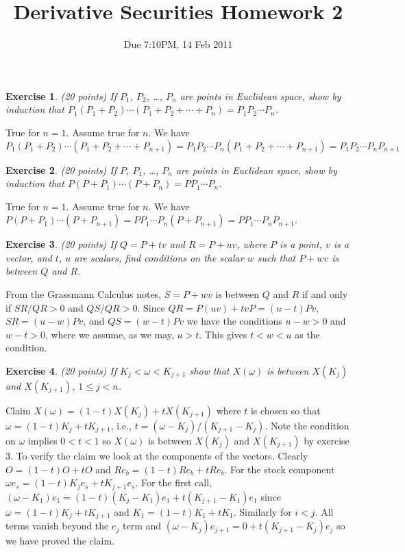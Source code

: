 \documentclass[11pt,fleqn]{amsproc}
\newtheorem{xca}{Exercise}
\begin{document}
\title{Derivative Securities Homework 2}
\author{Due 7:10PM, 14 Feb 2011}

\maketitle

\begin{xca}{(20 points)}
If $P_1$, $P_2$, \dots, $P_n$ are points in Euclidean space, show by
induction that $P_1(P_1 + P_2)\cdots(P_1 + P_2 + \cdots + P_n) = P_1
P_2 \cdots P_n$.

\end{xca}
True for $n = 1$. Assume true for $n$. We have
$P_1(P_1 + P_2)\cdots(P_1 + P_2 + \cdots + P_{n+1})
= P_1P_2 \cdots P_n(P_1 + P_2 + \cdots + P_{n+1})
= P_1P_2 \cdots P_n P_{n+1}$

\begin{xca}{(20 points)}
If $P$, $P_1$, \dots, $P_n$ are points in Euclidean space, show by
induction that $P(P + P_1)\cdots(P + P_n) = PP_1\cdots P_n$.

\end{xca}

True for $n = 1$. Assume true for $n$. We have
$P(P + P_1)\cdots(P + P_{n+1}) = PP_1\cdots P_n(P + P_{n+1})
= PP_1\cdots P_n P_{n+1}$.

\begin{xca}{(20 points)}
If $Q = P + tv$ and $R = P + uv$, where $P$ is a point, $v$ is a vector,
and $t$, $u$ are scalars, find conditions on the scalar $w$ such that $P +
wv$ is between $Q$ and $R$.

\end{xca}

From the Grassmann Calculus notes, $S = P + wv$ is between $Q$ and
$R$ if and only if $SR/QR > 0$ and $QS/QR > 0$. Since
$QR = P(uv) + tvP = (u - t)Pv$, $SR = (u - w)Pv$, and
$QS = (w - t)Pv$ we have the conditions $u - w > 0$ and
$w - t > 0$, where we assume, as we may, $u > t$.
This gives $t < w < u$ as the condition.

\begin{xca}{(20 points)}
If $K_j < \omega < K_{j+1}$ show that $X(\omega)$ is between $X(K_j)$
and $X(K_{j+1})$, $1\le j < n$.

\end{xca}

Claim $X(\omega) = (1 - t)X(K_j) + t X(K_{j+1})$ where $t$ is
chosen so that $\omega = (1 - t)K_j + tK_{j+1}$, i.e.,
$t = (\omega - K_j)/(K_{j+1} - K_j)$. Note the condition on $\omega$
implies $0 < t < 1$ so $X(\omega)$ is between $X(K_j)$ and $X(K_{j+1})$
by exercise 3. To verify the claim we look at the components
of the vectors. Clearly $O = (1-t)O + tO$ and $Re_b = (1 - t)Re_b
+ tRe_b$. For the stock component $\omega e_s = (1 - t)K_je_s + tK_{j + 1}e_s$.
For the first call, $(\omega - K_1)e_1 = (1 - t)(K_j - K_1)e_1 + t(K_{j+1} - K_1)e_1$ since $\omega = (1 - t)K_j + tK_{j+1}$ and $K_1 = (1 - t)K_1 + tK_1$.
Similarly for $i < j$. All terms vanish beyond the $e_j$ term
and $(\omega - K_j)e_{j + 1} = 0 + t(K_{j+1} - K_j)e_j$ so we have
proved the claim.
\end{document}
